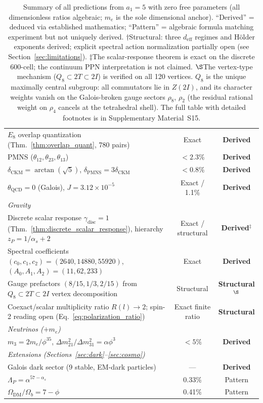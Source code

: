 \documentclass[12pt,a4paper]{article}
\theoremstyle{definition}
\begin{document}
\begin{table}[H]
\begin{tabular}{lcc}
$E_8$ overlap quantization (Thm.~\ref{thm:overlap_quant}, 780 pairs) & Exact & \textbf{Derived} \\
PMNS ($\theta_{12}, \theta_{23}, \theta_{13}$) & $<2.3\%$ & \textbf{Derived} \\
$\delta_{\text{CKM}} = \arctan(\sqrt{5})$, $\delta_{\text{PMNS}} = 3\delta_{\text{CKM}}$ & $<0.8\%$ & \textbf{Derived} \\
$\theta_{\text{QCD}} = 0$ (Galois), $J = 3.12 \times 10^{-5}$ & Exact / 1.1\% & \textbf{Derived} \\
\midrule
\multicolumn{3}{l}{\textit{Gravity}} \\
Discrete scalar response $\gamma_{\mathrm{disc}} = 1$ (Thm.~\ref{thm:discrete_scalar_response}), hierarchy $z_P = 1/\alpha_s + 2$ & Exact / structural & \textbf{Derived}$^\ddagger$ \\
Spectral coefficients $(c_0,c_1,c_2) = (2640,14880,55920)$, $(A_0,A_1,A_2) = (11,62,233)$ & Exact & \textbf{Derived} \\
Gauge prefactors $(8/15,1/3,2/15)$ from $Q_8 \subset 2T \subset 2I$ vertex decomposition & Structural & \textbf{Structural}$^\S$ \\
Coexact/scalar multiplicity ratio $R(l)\to2$; spin-2 reading open (Eq.~\ref{eq:polarization_ratio}) & Exact finite ratio & \textbf{Structural} \\
\midrule
\multicolumn{3}{l}{\textit{Neutrinos ($+m_e$)}} \\
$m_3 = 2m_e/\phi^{35}$, $\Delta m^2_{21}/\Delta m^2_{31} = \alpha\phi^3$ & $<5\%$ & \textbf{Derived} \\
\midrule
\multicolumn{3}{l}{\textit{Extensions (Sections~\ref{sec:dark}--\ref{sec:cosmo})}} \\
Galois dark sector (9 stable, EM-dark particles) & --- & \textbf{Derived} \\
$\Lambda_P = \alpha^{57-\alpha_s}$ & 0.33\% & Pattern \\
$\Omega_{\text{DM}}/\Omega_b = 7 - \phi$ & 0.41\% & Pattern \\
\bottomrule
\end{tabular}
\caption[Summary of predictions.]{Summary of all predictions from $a_1 = 5$ with zero free parameters (all dimensionless ratios algebraic; $m_e$ is the sole dimensional anchor).  ``Derived'' = deduced via established mathematics; ``Pattern'' = algebraic formula matching experiment but not uniquely derived.  $\dagger$Structural: three $d_{\text{eff}}$ regimes and H\"{o}lder exponents derived; explicit spectral action normalization partially open (see Section~\ref{sec:limitations}).  $\ddagger$The scalar-response theorem is exact on the discrete 600-cell; the continuum PPN interpretation is not claimed.  $\S$The vertex-type mechanism ($Q_8 \subset 2T \subset 2I$) is verified on all 120 vertices.  $Q_8$ is the unique maximally central subgroup: all commutators lie in $Z(2I)$, and its character weights vanish on the Galois-broken gauge sectors $\rho_8$, $\rho_2$ (the residual rational weight on $\rho_4$ cancels at the tetrahedral shell).  The full table with detailed footnotes is in Supplementary Material~S15.}
\label{tab:summary}
\end{table}
\end{document}
